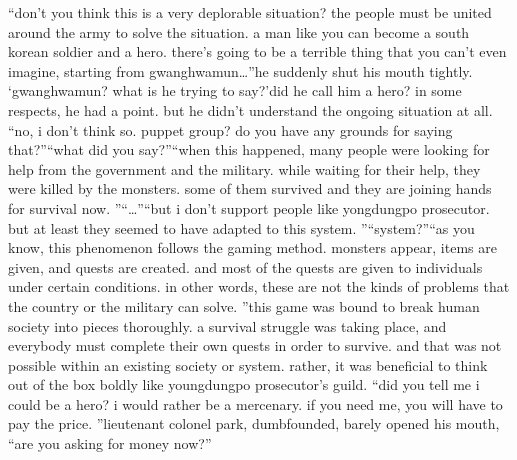 “don’t you think this is a very deplorable situation? the people must be united around the army to solve the situation.
 a man like you can become a south korean soldier and a hero.
 there’s going to be a terrible thing that you can’t even imagine, starting from gwanghwamun…”he suddenly shut his mouth tightly.
‘gwanghwamun? what is he trying to say?’did he call him a hero? in some respects, he had a point.
 but he didn’t understand the ongoing situation at all.
“no, i don’t think so.
 puppet group? do you have any grounds for saying that?”“what did you say?”“when this happened, many people were looking for help from the government and the military.
 while waiting for their help, they were killed by the monsters.
 some of them survived and they are joining hands for survival now.
”“…”“but i don’t support people like yongdungpo prosecutor.
 but at least they seemed to have adapted to this system.
”“system?”“as you know, this phenomenon follows the gaming method.
 monsters appear, items are given, and quests are created.
 and most of the quests are given to individuals under certain conditions.
 in other words, these are not the kinds of problems that the country or the military can solve.
”this game was bound to break human society into pieces thoroughly.
 a survival struggle was taking place, and everybody must complete their own quests in order to survive.
and that was not possible within an existing society or system.
 rather, it was beneficial to think out of the box boldly like youngdungpo prosecutor’s guild.
“did you tell me i could be a hero? i would rather be a mercenary.
 if you need me, you will have to pay the price.
”lieutenant colonel park, dumbfounded, barely opened his mouth, “are you asking for money now?”

 